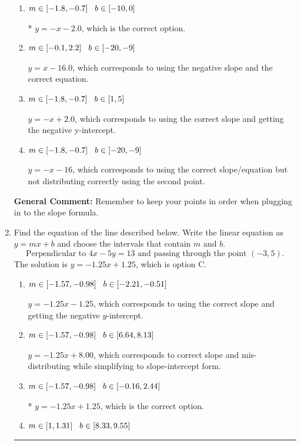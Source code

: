 \documentclass{extbook}[14pt]
\newcommand{\litem}[1]{\item #1

\rule{\textwidth}{0.4pt}}
\begin{document}
\begin{enumerate}
{\begin{enumerate}[label=\Alph*.]
 $y = -x + 18$, which corresponds to using the correct slope/equation but not distributing correctly using the first point.
\item \( m \in [-1.8, -0.7] \hspace*{3mm} b \in [-10, 0] \)

* $y = -x -2.0$, which is the correct option.
\item \( m \in [-0.1, 2.2] \hspace*{3mm} b \in [-20, -9] \)

 $y = x -16.0$, which corresponds to using the negative slope and the correct equation.
\item \( m \in [-1.8, -0.7] \hspace*{3mm} b \in [1, 5] \)

 $y = -x + 2.0$, which corresponds to using the correct slope and getting the negative y-intercept.
\item \( m \in [-1.8, -0.7] \hspace*{3mm} b \in [-20, -9] \)

 $y = -x -16$, which corresponds to using the correct slope/equation but not distributing correctly using the second point.
\end{enumerate}

\textbf{General Comment:} Remember to keep your points in order when plugging in to the slope formula.
}
\litem{
Find the equation of the line described below. Write the linear equation as $ y=mx+b $ and choose the intervals that contain $m$ and $b$.
\[ \text{Perpendicular to } 4 x - 5 y = 13 \text{ and passing through the point } (-3, 5). \]The solution is \( y = -1.25x + 1.25 \), which is option C.\begin{enumerate}[label=\Alph*.]
\item \( m \in [-1.57, -0.98] \hspace*{3mm} b \in [-2.21, -0.51] \)

 $y = -1.25x - 1.25$, which corresponds to using the correct slope and getting the negative $y$-intercept.
\item \( m \in [-1.57, -0.98] \hspace*{3mm} b \in [6.64, 8.13] \)

 $y = -1.25x + 8.00$, which corresponds to correct slope and mis-distributing while simplifying to slope-intercept form.
\item \( m \in [-1.57, -0.98] \hspace*{3mm} b \in [-0.16, 2.44] \)

* $y = -1.25x + 1.25$, which is the correct option.
\item \( m \in [1, 1.31] \hspace*{3mm} b \in [8.33, 9.55] \)


\end{enumerate}}
\end{enumerate}
\end{document}
